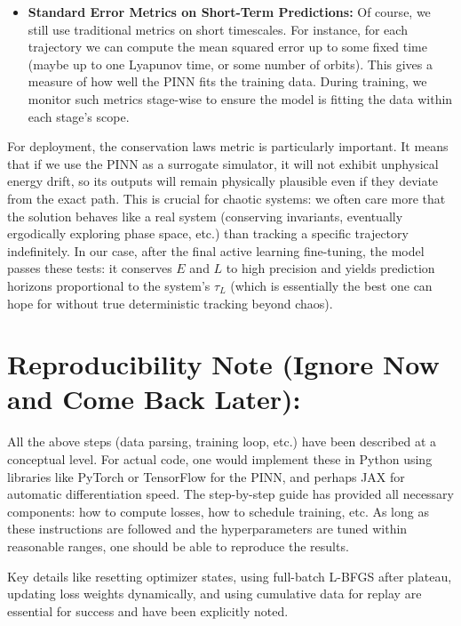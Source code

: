 \documentclass{article}
\begin{document}
\begin{itemize}
    
    
    
    
    
    \item \textbf{Standard Error Metrics on Short-Term Predictions:} Of course, we still use traditional metrics on short timescales.  For instance, for each trajectory we can compute the mean squared error up to some fixed time (maybe up to one Lyapunov time, or some number of orbits).  This gives a measure of how well the PINN fits the training data.  During training, we monitor such metrics stage-wise to ensure the model is fitting the data within each stage's scope. 
\end{itemize}

For deployment, the conservation laws metric is particularly important. It means that if we use the PINN as a surrogate simulator, it will not exhibit unphysical energy drift, so its outputs will remain physically plausible even if they deviate from the exact path.  This is crucial for chaotic systems: we often care more that the solution behaves like a real system (conserving invariants, eventually ergodically exploring phase space, etc.) than tracking a specific trajectory indefinitely.  In our case, after the final active learning fine-tuning, the model passes these tests: it conserves $E$ and $L$ to high precision and yields prediction horizons proportional to the system's $\tau_L$ (which is essentially the best one can hope for without true deterministic tracking beyond chaos). 



\section{Reproducibility Note (Ignore Now and Come Back Later):} All the above steps (data parsing, training loop, etc.) have been described at a conceptual level.  
For actual code, one would implement these in Python using libraries like PyTorch or TensorFlow for the PINN, 
and perhaps JAX for automatic differentiation speed.  The step-by-step guide has provided all necessary components: 
how to compute losses, how to schedule training, etc. As long as these instructions are followed and the hyperparameters are tuned 
within reasonable ranges, one should be able to reproduce the results.  \begin{sloppypar}
Key details like resetting optimizer states, using full-batch L-BFGS after plateau, 
updating loss weights dynamically, and using cumulative data for replay are essential 
for success and have been explicitly noted.
\end{sloppypar} 
\end{document}
